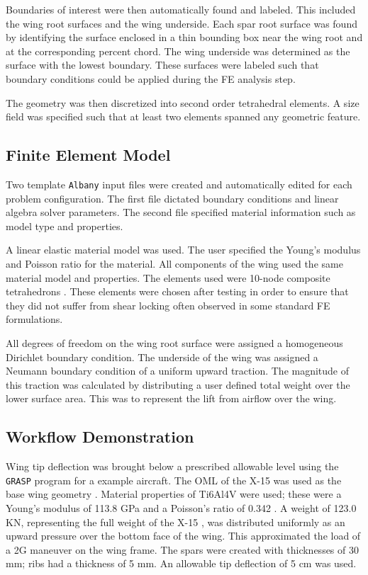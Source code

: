 \documentclass[conf]{new-aiaa}
\begin{document}
Boundaries of interest were then automatically found and labeled. 
This included the wing root surfaces and the wing underside.
Each spar root surface was found by identifying the surface enclosed in 
a thin bounding box near the wing root and at the corresponding percent chord.
The wing underside was determined as the surface with the 
lowest boundary.
These surfaces were labeled such that boundary conditions 
could be applied during the FE analysis step.

The geometry was then discretized into second order tetrahedral elements. 
A size field was specified such that at least two elements
spanned any geometric feature.

\subsection{Finite Element Model} \label{sec:meth_FEM}
Two template \texttt{Albany} input files were created 
and automatically edited for each problem configuration.
The first file dictated boundary conditions and linear algebra solver parameters.
The second file specified material information such as model type and properties.

A linear elastic material model was used.
The user specified the Young's modulus and Poisson ratio for the material. 
All components of the wing used the same material model and properties.
The elements used were 10-node composite tetrahedrons
\cite{ostien_10_node_comp_tet_FE_for_solid_mechanics}.
These elements were chosen after testing in order to
ensure that they did not suffer from shear locking
often observed in some standard FE formulations.

All degrees of freedom on the wing root surface were assigned
a homogeneous Dirichlet boundary condition.
The underside of the wing was assigned a
Neumann boundary condition of a uniform upward traction.
The magnitude of this traction was calculated by distributing
a user defined total weight over the lower surface area.
This was to represent the lift from airflow over the wing.

\subsection{Workflow Demonstration} \label{sec:meth_demonstration}
Wing tip deflection was brought below a prescribed allowable level
using the \texttt{GRASP} program for a example aircraft.
The OML of the X-15 was used as the base wing geometry 
\cite{gochenaur_rapid_geometry_generation_and_basic_comparison_x15}.
Material properties of Ti6Al4V were used;
these were a Young's modulus of 113.8 GPa and
a Poisson's ratio of 0.342 \cite{boyes_materials_properties_handbook_titanium_alloys}.
A weight of 123.0 KN, representing the full weight of the X-15 
\cite{gochenaur_rapid_geometry_generation_and_basic_comparison_x15},
was distributed uniformly as an upward pressure over the bottom face of the wing.
This approximated the load of a 2G maneuver on the wing frame.
The spars were created with thicknesses of 30 mm;
ribs had a thickness of 5 mm.
An allowable tip deflection of  5 cm was used.
\end{document}
